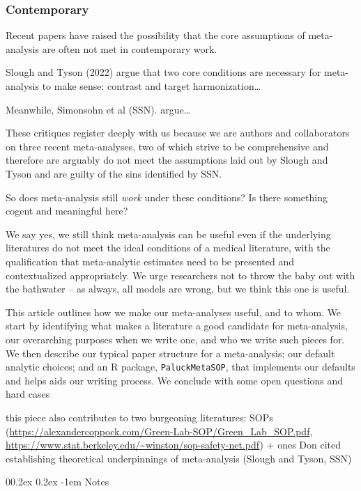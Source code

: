 \documentclass[
  man]{apa6}
\makeatletter
\let\oldparagraph\paragraph
\renewcommand{\paragraph}[1]{\oldparagraph{#1}\mbox{}}
\renewcommand{\paragraph}{\@startsection{paragraph}{4}{\parindent}%
  {0\baselineskip \@plus 0.2ex \@minus 0.2ex}%
  {-1em}%
  {\normalfont\normalsize\bfseries\itshape\typesectitle}}
\makeatother
\begin{document}
\subsubsection{Contemporary}\label{contemporary}

Recent papers have raised the possibility that the core assumptions of meta-analysis are often not met in contemporary work.

Slough and Tyson (2022) argue that two core conditions are necessary for meta-analysis to make sense: contrast and target harmonization\ldots{}

Meanwhile, Simonsohn et al (SSN). argue\ldots{}

These critiques register deeply with us because we are authors and collaborators on three recent meta-analyses, two of which strive to be comprehensive and therefore are arguably do not meet the assumptions laid out by Slough and Tyson and are guilty of the sins identified by SSN.

So does meta-analysis still \emph{work} under these conditions? Is there something cogent and meaningful here?

We say yes, we still think meta-analysis can be useful even if the underlying literatures do not meet the ideal conditions of a medical literature, with the qualification that meta-analytic estimates need to be presented and contextualized appropriately. We urge researchers not to throw the baby out with the bathwater -- as always, all models are wrong, but we think this one is useful.

This article outlines how we make our meta-analyses useful, and to whom. We start by identifying what makes a literature a good candidate for meta-analysis, our overarching purposes when we write one, and who we write such pieces for. We then describe our typical paper structure for a meta-analysis; our default analytic choices; and an R package, \texttt{PaluckMetaSOP}, that implements our defaults and helps aids our writing process. We conclude with some open questions and hard cases

this piece also contributes to two burgeoning literatures:
SOPs (\url{https://alexandercoppock.com/Green-Lab-SOP/Green_Lab_SOP.pdf}, \url{https://www.stat.berkeley.edu/~winston/sop-safety-net.pdf}) + ones Don cited
establishing theoretical underpinnings of meta-analysis (Slough and Tyson, SSN)

\paragraph{Notes}\label{notes}
\end{document}
